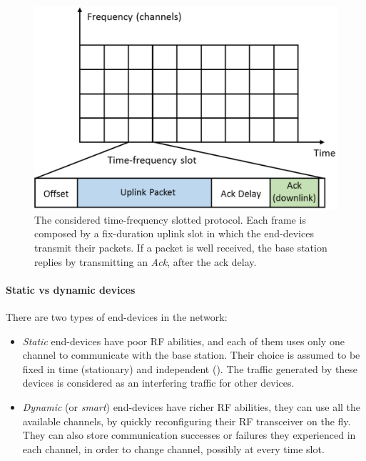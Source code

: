 \begin{figure}[!t]
    \centering
    \includegraphics[scale=0.40]{protocol.eps}
    \caption{The considered time-frequency slotted protocol. Each frame is composed by a fix-duration uplink slot in which the end-devices transmit their packets. If a packet is well received, the base station replies by transmitting an \emph{Ack}, after the ack delay.}
    \label{fig:41:protocol}
\end{figure}


\paragraph{Static vs dynamic devices}
%
There are two types of end-devices in the network:
\begin{itemize}
    \item
    \emph{Static} end-devices have poor RF abilities, and each of them uses only one channel to communicate with the base station. Their choice is assumed to be fixed in time (stationary) and independent (\iid). The traffic generated by these devices is considered as an interfering traffic for other devices.
    \item
    \emph{Dynamic} (or \emph{smart}) end-devices have richer RF abilities, they can use all the available channels, by quickly reconfiguring their RF transceiver on the fly. They can also store communication successes or failures they experienced in each channel, in order to change channel, possibly at every time slot.
\end{itemize}

